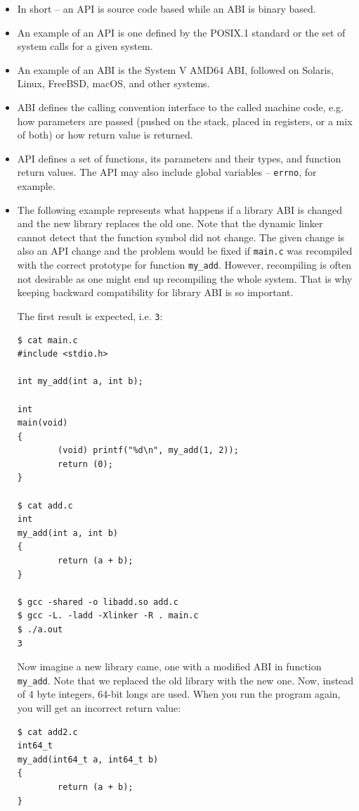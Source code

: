 \begin{itemize}
\item In short -- an API is source code based while an ABI is binary based.
\item An example of an API is one defined by the POSIX.1 standard or the set of
system calls for a given system.
\item An example of an ABI is the System V AMD64 ABI, followed on Solaris,
Linux, FreeBSD, macOS, and other systems.
\item ABI defines the calling convention interface to the called machine code, e.g.
how parameters are passed (pushed on the stack, placed in registers, or a mix
of both) or how return value is returned.
\item API defines a set of functions, its parameters and their types, and
function return values.  The API may also include global variables --
\texttt{errno}, for example.
\item The following example represents what happens if a library ABI is changed
and the new library replaces the old one.  Note that the dynamic linker cannot
detect that the function symbol did not change.  The given change is also an
API change and the problem would be fixed if \texttt{main.c} was recompiled
with the correct prototype for function \texttt{my\_add}.  However,
recompiling is often not desirable as one might end up recompiling the whole
system.  That is why keeping backward compatibility for library ABI is so
important.

The first result is expected, i.e. \texttt{3}:

\begin{verbatim}
$ cat main.c 
#include <stdio.h>

int my_add(int a, int b);

int
main(void)
{
        (void) printf("%d\n", my_add(1, 2));
        return (0);
}

$ cat add.c
int
my_add(int a, int b)
{
        return (a + b);
}

$ gcc -shared -o libadd.so add.c
$ gcc -L. -ladd -Xlinker -R . main.c
$ ./a.out 
3
\end{verbatim}

Now imagine a new library came, one with a modified ABI in function
\texttt{my\_add}.  Note that we replaced the old library with the new one.
Now, instead of 4 byte integers, 64-bit longs are used.  When you run the
program again, you will get an incorrect return value:

\begin{verbatim}
$ cat add2.c
int64_t
my_add(int64_t a, int64_t b)
{
        return (a + b);
}


\end{verbatim}
\end{itemize}
